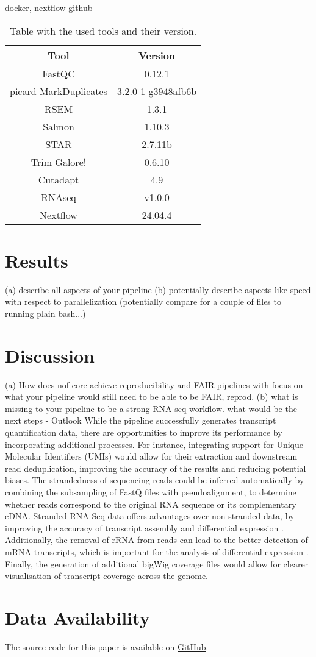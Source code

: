 \documentclass{article}
\theoremstyle{plain}
\theoremstyle{definition}
\theoremstyle{remark}
\begin{document}
docker, nextflow github
\begin{table}[h]
    \centering
    \caption{Table with the used tools and their version.}
    \label{table:1}
    \begin{tabular}{||c c||}
        \hline
        Tool & Version \\
        \hline\hline
        FastQC & 0.12.1\\
        picard MarkDuplicates & 3.2.0-1-g3948afb6b\\
        RSEM & 1.3.1\\
        Salmon & 1.10.3\\
        STAR & 2.7.11b\\
        Trim Galore! & 0.6.10\\
        Cutadapt & 4.9\\
        RNAseq & v1.0.0\\
        Nextflow & 24.04.4\\
        \hline
    \end{tabular}
\end{table}

\section{Results}
(a) describe all aspects of your pipeline
(b) potentially describe aspects like speed with respect to parallelization (potentially compare
for a couple of files to running plain bash...)

\section{Discussion}
(a) How does nof-core achieve reproducibility and FAIR pipelines with focus on what your
pipeline would still need to be able to be FAIR, reprod.
(b) what is missing to your pipeline to be a strong RNA-seq workflow. what would be the next
steps - Outlook
While the pipeline successfully generates transcript quantification data, there are opportunities to improve its performance by incorporating additional processes. For instance, integrating support for Unique Molecular Identifiers (UMIs) would allow for their extraction and downstream read deduplication, improving the accuracy of the results and reducing potential biases. The strandedness of sequencing reads could be inferred automatically by combining the subsampling of FastQ files with pseudoalignment, to determine whether reads correspond to the original RNA sequence or its complementary cDNA. Stranded RNA-Seq data offers advantages over non-stranded data, by improving the accuracy of transcript assembly and differential expression \cite{Signal2022}. Additionally, the removal of rRNA from reads can lead to the better detection of mRNA transcripts, which is important for the analysis of differential expression \cite{Pastor2022}. Finally, the generation of additional bigWig coverage files would allow for clearer visualisation of transcript coverage across the genome.

\section*{Data Availability}
The source code for this paper is available on \href{{https://github.com/JuliaGraf/RNAseq}}{GitHub}.



\end{document}
